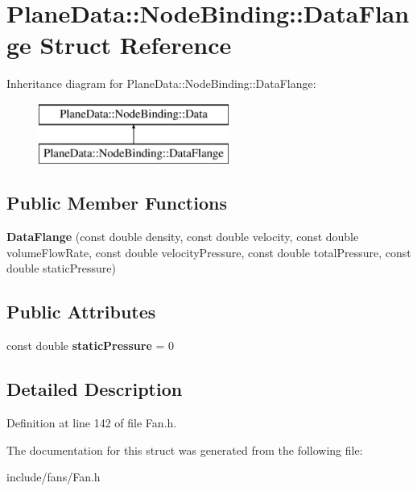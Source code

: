 \hypertarget{struct_plane_data_1_1_node_binding_1_1_data_flange}{}\section{Plane\+Data\+:\+:Node\+Binding\+:\+:Data\+Flange Struct Reference}
\label{struct_plane_data_1_1_node_binding_1_1_data_flange}
Inheritance diagram for Plane\+Data\+:\+:Node\+Binding\+:\+:Data\+Flange\+:\begin{figure}[H]
\begin{center}
\leavevmode
\includegraphics[height=2.000000cm]{d5/d92/struct_plane_data_1_1_node_binding_1_1_data_flange}
\end{center}
\end{figure}
\subsection*{Public Member Functions}
\begin{DoxyCompactItemize}
\item 
\mbox{\label{struct_plane_data_1_1_node_binding_1_1_data_flange_ab70d450f11914a68f121f32b58b11f29}} 
{\bfseries Data\+Flange} (const double density, const double velocity, const double volume\+Flow\+Rate, const double velocity\+Pressure, const double total\+Pressure, const double static\+Pressure)
\end{DoxyCompactItemize}
\subsection*{Public Attributes}
\begin{DoxyCompactItemize}
\item 
\mbox{\label{struct_plane_data_1_1_node_binding_1_1_data_flange_a84b898bd8e199e2681324381aeb158d6}} 
const double {\bfseries static\+Pressure} = 0
\end{DoxyCompactItemize}


\subsection{Detailed Description}


Definition at line 142 of file Fan.\+h.



The documentation for this struct was generated from the following file\+:\begin{DoxyCompactItemize}
\item 
include/fans/Fan.\+h\end{DoxyCompactItemize}
